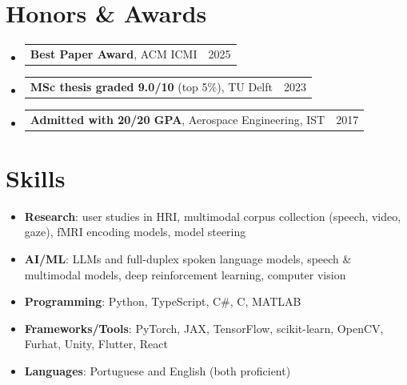 \documentclass[letterpaper,11pt]{article}
\makeatletter
\newcommand{\resumeItem}[1]{
  \item\small{
    {#1 \vspace{-2pt}}
  }
}
\newcommand{\resumeProjectHeading}[2]{
    \item
    \begin{tabular*}{0.97\textwidth}{l@{\extracolsep{\fill}}r}
      \small#1 & #2 \\
    \end{tabular*}\vspace{-7pt}
}
\newcommand{\resumeSubHeadingListStart}{\begin{itemize}[leftmargin=0.15in, label={}]}
\newcommand{\resumeSubHeadingListEnd}{\end{itemize}}
\newcommand{\resumeItemListStart}{\begin{itemize}}
\newcommand{\resumeItemListEnd}{\end{itemize}\vspace{-5pt}}
\makeatother
\begin{document}
\section{Honors \& Awards}
\resumeSubHeadingListStart
  \resumeProjectHeading{\textbf{Best Paper Award}, ACM ICMI}{2025}
  \resumeProjectHeading{\textbf{MSc thesis graded 9.0/10} (top 5\%), TU Delft}{2023}
  \resumeProjectHeading{\textbf{Admitted with 20/20 GPA}, Aerospace Engineering, IST}{2017}
\resumeSubHeadingListEnd

\section{Skills}
\resumeItemListStart
  \resumeItem{\textbf{Research}: user studies in HRI, multimodal corpus collection (speech, video, gaze), fMRI encoding models, model steering}
  \resumeItem{\textbf{AI/ML}: LLMs and full-duplex spoken language models, speech \& multimodal models, deep reinforcement learning, computer vision}
  \resumeItem{\textbf{Programming}: Python, TypeScript, C\#, C, MATLAB}
  \resumeItem{\textbf{Frameworks/Tools}: PyTorch, JAX, TensorFlow, scikit-learn, OpenCV, Furhat, Unity, Flutter, React}
  \resumeItem{\textbf{Languages}: Portuguese and English (both proficient)}
\resumeItemListEnd
\end{document}
